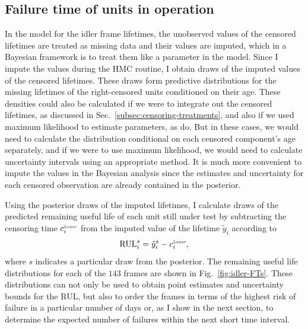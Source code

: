 \subsection{Failure time of units in operation} \label{subsec:idler-FTs}

In the model for the idler frame lifetimes, the unobserved values of the censored lifetimes are treated as missing data and their values are imputed, which in a Bayesian framework is to treat them like a parameter in the model. Since I impute the values during the HMC routine, I obtain draws of the imputed values of the censored lifetimes. These draws form predictive distributions for the missing lifetimes of the right-censored units conditioned on their age. These densities could also be calculated if we were to integrate out the censored lifetimes, as discussed in Sec.~\ref{subsec:censoring-treatments}, and also if we used maximum likelihood to estimate parameters, as \citet{hong2009} do. But in these cases, we would need to calculate the distribution conditional on each censored component's age separately, and if we were to use maximum likelihood, we would need to calculate uncertainty intervals using an appropriate method. It is much more convenient to impute the values in the Bayesian analysis since the estimates and uncertainty for each censored observation are already contained in the posterior.

Using the posterior draws of the imputed lifetimes, I calculate draws of the predicted remaining useful life of each unit still under test by subtracting the censoring time $c^{\textit{\tiny{Lower}}}_i$ from the imputed value of the lifetime $\tilde{y}_{i}$ according to
\begin{equation} \label{eq:idler-rul}
  \hbox{RUL}^s_i  = \tilde{y}_{i}^s - c^{\textit{\tiny{Lower}}}_i,
\end{equation}
where $s$ indicates a particular draw from the posterior. The remaining useful life distributions for each of the $143$ frames are shown in Fig.~\ref{fig:idler-FTs}. These distributions can not only be used to obtain point estimates and uncertainty bounds for the RUL, but also to order the frames in terms of the highest risk of failure in a particular number of days or, as I show in the next section, to determine the expected number of failures within the next short time interval.


